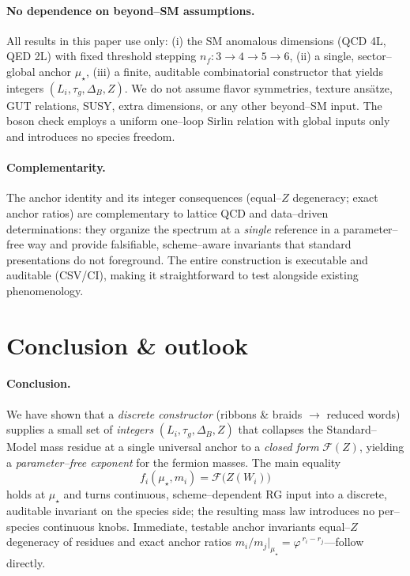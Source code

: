 \documentclass[epjc3]{svjour3}
\begin{document}
\paragraph{No dependence on beyond--SM assumptions.}
All results in this paper use only:
(i) the SM anomalous dimensions (QCD 4L, QED 2L) with fixed threshold stepping $n_f:3\!\to\!4\!\to\!5\!\to\!6$,
(ii) a single, sector--global anchor $\mu_\star$,
(iii) a finite, auditable combinatorial constructor that yields integers $(L_i,\tau_g,\Delta_B,Z)$.
We do not assume flavor symmetries, texture ans\"atze, GUT relations, SUSY, extra dimensions, or any other beyond--SM input.  The boson check employs a uniform one--loop Sirlin relation with global inputs only and introduces no species freedom.

\paragraph{Complementarity.}
The anchor identity and its integer consequences (equal--$Z$ degeneracy; exact anchor ratios) are complementary to lattice QCD and data--driven determinations: they organize the spectrum at a \emph{single} reference in a parameter--free way and provide falsifiable, scheme--aware invariants that standard presentations do not foreground.  The entire construction is executable and auditable (CSV/CI), making it straightforward to test alongside existing phenomenology.

\section{Conclusion \& outlook}

\paragraph{Conclusion.}
We have shown that a \emph{discrete constructor} (ribbons \& braids $\to$ reduced words) supplies a small set of \emph{integers} $(L_i,\tau_g,\Delta_B,Z)$ that collapses the Standard–Model mass residue at a single universal anchor to a \emph{closed form} $\mathcal F(Z)$, yielding a \emph{parameter–free exponent} for the fermion masses. The main equality
\[
  f_i(\mu_\star,m_i)=\mathcal F\!\bigl(Z(W_i)\bigr)
\]
holds at $\mu_\star$ and turns continuous, scheme–dependent RG input into a discrete, auditable invariant on the species side; the resulting mass law introduces no per–species continuous knobs. Immediate, testable anchor invariants equal–$Z$ degeneracy of residues and exact anchor ratios $m_i/m_j|_{\mu_\star}=\varphi^{\,r_i-r_j}$—follow directly.
\end{document}
